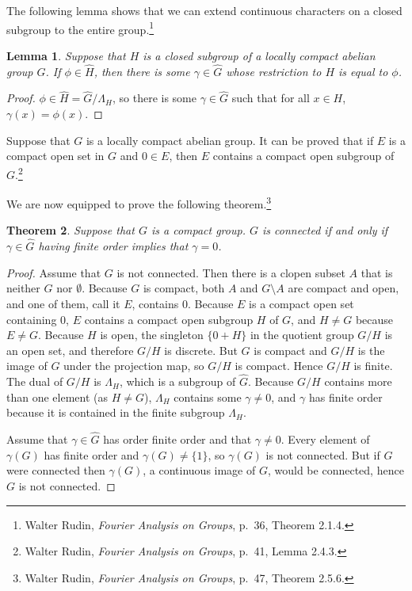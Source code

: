 \documentclass{article}
\newtheorem{theorem}{Theorem}
\newtheorem{lemma}[theorem]{Lemma}
\begin{document}
The following lemma shows that we can extend continuous characters on a closed subgroup to the entire group.\footnote{Walter
Rudin, {\em Fourier Analysis on Groups}, p.~36, Theorem 2.1.4.}

\begin{lemma}
Suppose that $H$ is a closed subgroup of a locally compact abelian group $G$. If $\phi \in \widehat{H}$, then there is some $\gamma \in \widehat{G}$ whose restriction to
$H$ is equal to $\phi$.
\end{lemma}
\begin{proof}
$\phi \in \widehat{H} = \widehat{G} / \Lambda_H$, so there is some $\gamma \in \widehat{G}$ such that
for all $x \in H$, $\gamma(x)=\phi(x)$.
\end{proof}

Suppose that $G$ is a locally compact abelian group. It can be proved that if $E$ is a compact open set in $G$ and $0 \in
E$, then $E$ contains a compact open subgroup of $G$.\footnote{Walter Rudin, {\em Fourier Analysis on Groups}, p.~41,
Lemma 2.4.3.}

We are now equipped to prove the following theorem.\footnote{Walter Rudin, {\em Fourier Analysis on Groups}, p.~47, Theorem 2.5.6.}

\begin{theorem}
Suppose that $G$ is a compact group. $G$ is connected if and only if $\gamma \in \widehat{G}$ having finite order implies that $\gamma=0$.
\end{theorem}
\begin{proof}
Assume that $G$ is not connected. Then there is a clopen subset $A$ that is neither $G$ nor $\emptyset$. Because $G$ is compact,
both $A$ and $G \setminus A$ are compact and open, and one of them, call it $E$, contains $0$. 
Because $E$ is a compact open set containing $0$, $E$ contains a compact open subgroup $H$ of $G$, and $H \neq G$ because $E \neq G$.
Because $H$ is open, the singleton $\{0+H\}$ in the quotient group $G/H$ is an open set, and therefore $G/H$ is discrete. But
$G$ is compact and $G/H$ is the image of $G$ under the projection map, so $G/H$ is compact. Hence $G/H$ is finite. 
The dual of $G/H$ is $\Lambda_H$, which is a   subgroup of $\widehat{G}$. Because $G/H$
contains more than one element (as $H \neq G$), $\Lambda_H$ contains some $\gamma \neq 0$, and $\gamma$ has finite order because it is contained in the finite
subgroup $\Lambda_H$.

Assume that $\gamma \in \widehat{G}$ has order finite order and that $\gamma \neq 0$. Every element of $\gamma(G)$ has finite order and $\gamma(G) \neq \{1\}$,
so $\gamma(G)$ is not connected. But if $G$ were connected then $\gamma(G)$, a continuous image of $G$, would be connected, hence $G$ is not connected.
\end{proof}
\end{document}
